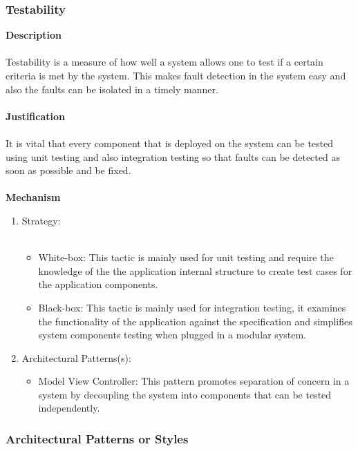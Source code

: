 \documentclass[hidelinks, 12pt, oneside]{article}
\begin{document}
			\subsubsection*{Testability}
			\textbf{Description}\\\\
			Testability is a measure of how well a system allows one to test if a certain criteria is met by the system. This makes fault detection in the system easy and also the faults can be isolated in a timely manner.\\\\
			\textbf{Justification}\\\\
			It is vital that every component that is deployed on the system can be tested using unit testing and also integration testing so that faults can be detected as soon as possible and be fixed. \\\\
			\textbf{Mechanism}
			\begin{enumerate}
				\item Strategy:\\\\
				\begin{itemize}
				\item White-box: This tactic is mainly used for unit testing and require the knowledge of the the application internal structure to create test cases for the application components.
				\item Black-box: This tactic is mainly used for integration testing, it examines the functionality of the application against the specification and simplifies system components testing when plugged in a modular system.
				\end{itemize}
				\item Architectural Patterns(s):
				\begin{itemize}
				\item Model View Controller: This pattern promotes separation of concern in a system by decoupling the system into components that can be tested independently.   
				\end{itemize}
			\end{enumerate}	
    \newpage
    \subsubsection{Architectural Patterns or Styles}
\end{document}
